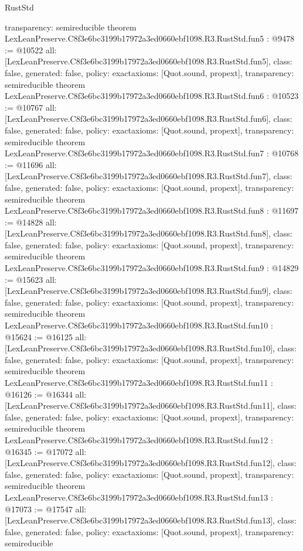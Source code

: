 \begin{lexlean}{RustStd}
\begin{coremodule}
{  transparency: semireducible
}
theorem LexLeanPreserve.C8f3e6bc3199b17972a3ed0660ebf1098.R3.RustStd.fun5 : @9478 := @10522 {
  all: [LexLeanPreserve.C8f3e6bc3199b17972a3ed0660ebf1098.R3.RustStd.fun5],
  class: false,
  generated: false,
  policy: exact{axioms: [Quot.sound, propext]},
  transparency: semireducible
}
theorem LexLeanPreserve.C8f3e6bc3199b17972a3ed0660ebf1098.R3.RustStd.fun6 : @10523 := @10767 {
  all: [LexLeanPreserve.C8f3e6bc3199b17972a3ed0660ebf1098.R3.RustStd.fun6],
  class: false,
  generated: false,
  policy: exact{axioms: [Quot.sound, propext]},
  transparency: semireducible
}
theorem LexLeanPreserve.C8f3e6bc3199b17972a3ed0660ebf1098.R3.RustStd.fun7 : @10768 := @11696 {
  all: [LexLeanPreserve.C8f3e6bc3199b17972a3ed0660ebf1098.R3.RustStd.fun7],
  class: false,
  generated: false,
  policy: exact{axioms: [Quot.sound, propext]},
  transparency: semireducible
}
theorem LexLeanPreserve.C8f3e6bc3199b17972a3ed0660ebf1098.R3.RustStd.fun8 : @11697 := @14828 {
  all: [LexLeanPreserve.C8f3e6bc3199b17972a3ed0660ebf1098.R3.RustStd.fun8],
  class: false,
  generated: false,
  policy: exact{axioms: [Quot.sound, propext]},
  transparency: semireducible
}
theorem LexLeanPreserve.C8f3e6bc3199b17972a3ed0660ebf1098.R3.RustStd.fun9 : @14829 := @15623 {
  all: [LexLeanPreserve.C8f3e6bc3199b17972a3ed0660ebf1098.R3.RustStd.fun9],
  class: false,
  generated: false,
  policy: exact{axioms: [Quot.sound, propext]},
  transparency: semireducible
}
theorem LexLeanPreserve.C8f3e6bc3199b17972a3ed0660ebf1098.R3.RustStd.fun10 : @15624 := @16125 {
  all: [LexLeanPreserve.C8f3e6bc3199b17972a3ed0660ebf1098.R3.RustStd.fun10],
  class: false,
  generated: false,
  policy: exact{axioms: [Quot.sound, propext]},
  transparency: semireducible
}
theorem LexLeanPreserve.C8f3e6bc3199b17972a3ed0660ebf1098.R3.RustStd.fun11 : @16126 := @16344 {
  all: [LexLeanPreserve.C8f3e6bc3199b17972a3ed0660ebf1098.R3.RustStd.fun11],
  class: false,
  generated: false,
  policy: exact{axioms: [Quot.sound, propext]},
  transparency: semireducible
}
theorem LexLeanPreserve.C8f3e6bc3199b17972a3ed0660ebf1098.R3.RustStd.fun12 : @16345 := @17072 {
  all: [LexLeanPreserve.C8f3e6bc3199b17972a3ed0660ebf1098.R3.RustStd.fun12],
  class: false,
  generated: false,
  policy: exact{axioms: [Quot.sound, propext]},
  transparency: semireducible
}
theorem LexLeanPreserve.C8f3e6bc3199b17972a3ed0660ebf1098.R3.RustStd.fun13 : @17073 := @17547 {
  all: [LexLeanPreserve.C8f3e6bc3199b17972a3ed0660ebf1098.R3.RustStd.fun13],
  class: false,
  generated: false,
  policy: exact{axioms: [Quot.sound, propext]},
  transparency: semireducible
}
\end{coremodule}
\end{lexlean}
